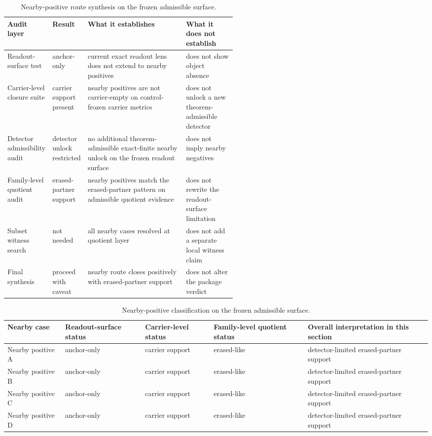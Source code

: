 \documentclass[11pt]{article}
\theoremstyle{definition}
\begin{document}
\begin{table}[t]
\centering
\small
\begin{tabularx}{\linewidth}{@{}>{\raggedright\arraybackslash}p{0.19\linewidth}>{\raggedright\arraybackslash}p{0.13\linewidth}>{\raggedright\arraybackslash}X>{\raggedright\arraybackslash}p{0.22\linewidth}@{}}
\toprule
Audit layer & Result & What it establishes & What it does not establish \\
\midrule
Readout-surface test & anchor-only & current exact readout lens does not extend to nearby positives & does not show object absence \\
Carrier-level closure suite & carrier support present & nearby positives are not carrier-empty on control-frozen carrier metrics & does not unlock a new theorem-admissible detector \\
Detector admissibility audit & detector unlock restricted & no additional theorem-admissible exact-finite nearby unlock on the frozen readout surface & does not imply nearby negatives \\
Family-level quotient audit & erased-partner support & nearby positives match the erased-partner pattern on admissible quotient evidence & does not rewrite the readout-surface limitation \\
Subset witness search & not needed & all nearby cases resolved at quotient layer & does not add a separate local witness claim \\
Final synthesis & proceed with caveat & nearby route closes positively with erased-partner support & does not alter the package verdict \\
\bottomrule
\end{tabularx}
\caption{Nearby-positive route synthesis on the frozen admissible surface.}
\label{tab:nearby-route-synthesis}
\end{table}

\begin{table}[t]
\centering
\begin{tabular}{p{}p{}p{}p{}p{}}
\hline
Nearby case & Readout-surface status & Carrier-level status & Family-level quotient status & Overall interpretation in this section \\
\hline
Nearby positive A & anchor-only & carrier support & erased-like & detector-limited erased-partner support \\
Nearby positive B & anchor-only & carrier support & erased-like & detector-limited erased-partner support \\
Nearby positive C & anchor-only & carrier support & erased-like & detector-limited erased-partner support \\
Nearby positive D & anchor-only & carrier support & erased-like & detector-limited erased-partner support \\
\hline
\end{tabular}
\caption{Nearby-positive classification on the frozen admissible surface.}
\label{tab:nearby-positive-classification}
\end{table}
\end{document}
